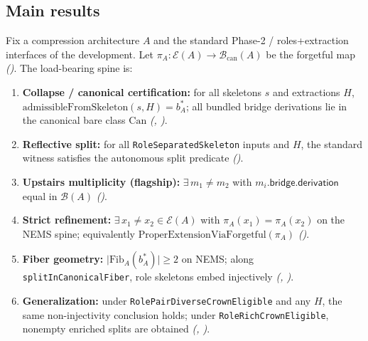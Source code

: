 \documentclass[11pt]{article}
\begin{document}
\subsection{Main results}\label{sec:intro-package}
\begin{theorem}\label{thm:main-results}
Fix a compression architecture $A$ and the standard Phase-2 / roles+extraction interfaces of the development. Let $\pi_A : \mathcal{E}(A) \to \mathcal{B}_{\mathrm{can}}(A)$ be the forgetful map \emph{()}. The load-bearing spine is:
\begin{enumerate}[label=(\arabic*)]
    \item \textbf{Collapse / canonical certification:} for all skeletons $s$ and extractions $H$, $\mathrm{admissibleFromSkeleton}(s,H) = b^\ast_A$; all bundled bridge derivations lie in the canonical bare class $\mathrm{Can}$ \emph{(, )}.
    \item \textbf{Reflective split:} for all \texttt{RoleSeparatedSkeleton} inputs and $H$, the standard witness satisfies the autonomous split predicate \emph{()}.
    \item \textbf{Upstairs multiplicity (flagship):} $\exists\, m_1 \neq m_2$ with $m_i.\mathsf{bridge}.\mathsf{derivation}$ equal in $\mathcal{B}(A)$ \emph{()}.
    \item \textbf{Strict refinement:} $\exists\, x_1 \neq x_2 \in \mathcal{E}(A)$ with $\pi_A(x_1) = \pi_A(x_2)$ on the NEMS spine; equivalently $\mathrm{ProperExtensionViaForgetful}(\pi_A)$ \emph{()}.
    \item \textbf{Fiber geometry:} $\lvert \mathrm{Fib}_A(b^\ast_A) \rvert \geq 2$ on NEMS; along \texttt{splitInCanonicalFiber}, role skeletons embed injectively \emph{(, )}.
    \item \textbf{Generalization:} under \texttt{RolePairDiverseCrownEligible} and any $H$, the same non-injectivity conclusion holds; under \texttt{RoleRichCrownEligible}, nonempty enriched splits are obtained \emph{(, )}.
\end{enumerate}
\end{theorem}
\end{document}
